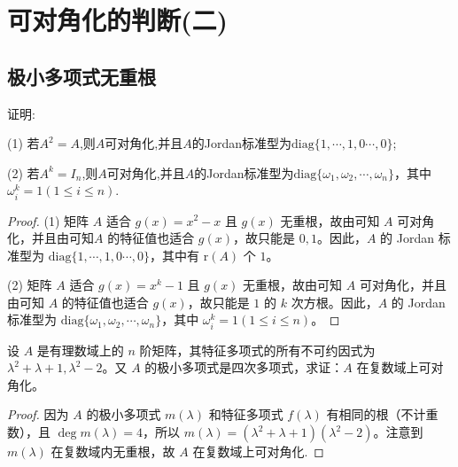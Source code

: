 \documentclass[../../main.tex]{subfiles}%
\begin{document}
\section{可对角化的判断(二)}

\subsection{极小多项式无重根}

\begin{proposition}\label{example:幂等和对合矩阵的Jordan标准型}
证明:

(1) 若$A^2 = A$,则$A$可对角化,并且$A$的Jordan标准型为$\mathrm{diag}\{1,\cdots,1,0\cdots,0\}$;

(2) 若$A^k = I_n$,则$A$可对角化,并且$A$的Jordan标准型为$\mathrm{diag}\{\omega_1,\omega_2,\cdots,\omega_n\}$，其中 $\omega_i^k = 1 (1\leqslant  i\leqslant  n)$.
\end{proposition}
\begin{proof}
(1) 矩阵 $A$ 适合 $g(x)=x^2 - x$ 且 $g(x)$ 无重根，故由可知 $A$ 可对角化，并且由可知$A$ 的特征值也适合 $g(x)$，故只能是 $0,1$。因此，$A$ 的 Jordan 标准型为 $\mathrm{diag}\{1,\cdots,1,0\cdots,0\}$，其中有 $\mathrm{r}(A)$ 个 $1$。

(2) 矩阵 $A$ 适合 $g(x)=x^k - 1$ 且 $g(x)$ 无重根，故由可知 $A$ 可对角化，并且由可知 $A$ 的特征值也适合 $g(x)$，故只能是 $1$ 的 $k$ 次方根。因此，$A$ 的 Jordan 标准型为 $\mathrm{diag}\{\omega_1,\omega_2,\cdots,\omega_n\}$，其中 $\omega_i^k = 1 (1\leqslant  i\leqslant  n)$。
\end{proof}

\begin{example}
设 $A$ 是有理数域上的 $n$ 阶矩阵，其特征多项式的所有不可约因式为 $\lambda^2 + \lambda + 1,\lambda^2 - 2$。又 $A$ 的极小多项式是四次多项式，求证：$A$ 在复数域上可对角化。
\end{example}
\begin{proof}
因为 $A$ 的极小多项式 $m(\lambda)$ 和特征多项式 $f(\lambda)$ 有相同的根（不计重数），且 $\deg m(\lambda)=4$，所以 $m(\lambda)=(\lambda^2 + \lambda + 1)(\lambda^2 - 2)$。注意到 $m(\lambda)$ 在复数域内无重根，故 $A$ 在复数域上可对角化.
\end{proof}
\end{document}
